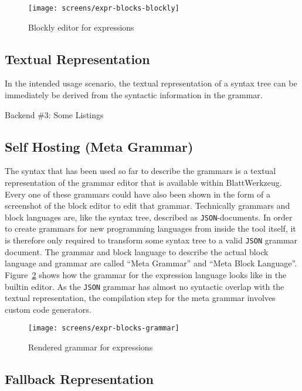 \documentclass[sigconf,natbib=false,review=true]{acmart}
\begin{document}
\begin{figure}
  \texttt{[image: screens/expr-blocks-blockly]}
  \caption{Blockly editor for expressions}
  \label{fig:screen-editor-expr-blockly}
\end{figure}

\subsection{Textual Representation}

In the intended usage scenario, the textual representation of a syntax tree can be immediately be derived from the syntactic information in the grammar.

Backend \#3: Some Listings

\subsection{Self Hosting (Meta Grammar)}

The syntax that has been used so far to describe the grammars is a textual representation of the grammar editor that is available within Blatt\-Werkzeug. Every one of these grammars could have also been shown in the form of a screenshot of the block editor to edit that grammar. Technically grammars and block languages are, like the syntax tree, described as \texttt{JSON}-documents. In order to create grammars for new programming languages from inside the tool itself, it is therefore only required to transform some syntax tree to a valid \texttt{JSON} grammar document. The grammar and block language to describe the actual block language and grammar are called \enquote{Meta Grammar} and \enquote{Meta Block Language}. Figure~\ref{fig:screen-editor-expr-grammar} shows how the grammar for the expression language looks like in the builtin editor. As the \texttt{JSON} grammar has almost no syntactic overlap with the textual representation, the compilation step for the meta grammar involves custom code generators.

\begin{figure}
  \texttt{[image: screens/expr-blocks-grammar]}
  \caption{Rendered grammar for expressions}
  \label{fig:screen-editor-expr-grammar}
\end{figure}



\subsection{Fallback Representation}
\end{document}
